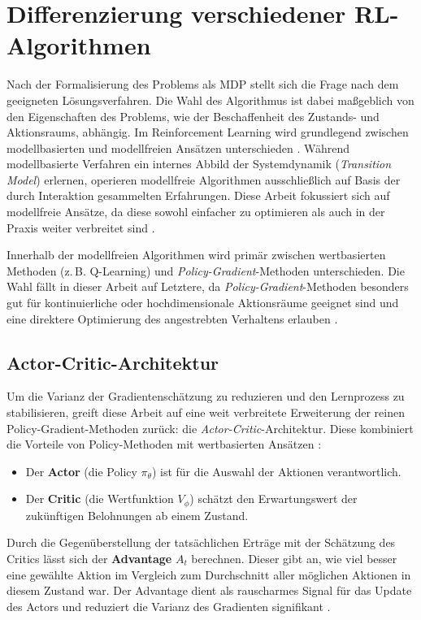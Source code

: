 \section{Differenzierung verschiedener RL\hyp{}Algorithmen}

Nach der Formalisierung des Problems als \ac{MDP} stellt sich die Frage nach dem geeigneten Lösungsverfahren. Die Wahl des Algorithmus ist dabei maßgeblich von den Eigenschaften des Problems, wie der Beschaffenheit des Zustands- und Aktionsraums, abhängig.
Im Reinforcement Learning wird grundlegend zwischen modellbasierten und modellfreien Ansätzen unterschieden \cite[Kap. 8]{sutton2018rl}. 
Während modellbasierte Verfahren ein internes Abbild der Systemdynamik (\textit{Transition Model}) erlernen, 
operieren modellfreie Algorithmen ausschließlich auf Basis der durch Interaktion gesammelten Erfahrungen. Diese Arbeit fokussiert sich auf modellfreie Ansätze, da diese sowohl einfacher zu optimieren als auch in der Praxis weiter verbreitet sind \cite{SpinningUp2018}.
\medskip

Innerhalb der modellfreien Algorithmen wird primär zwischen wertbasierten Methoden (z.\,B. Q\hyp{}Learning) und \textit{Policy\hyp{}Gradient}\hyp{}Methoden unterschieden. 
Die Wahl fällt in dieser Arbeit auf Letztere, da \textit{Policy\hyp{}Gradient}\hyp{}Methoden besonders gut für kontinuierliche oder hochdimensionale Aktionsräume 
geeignet sind und eine direktere Optimierung des angestrebten Verhaltens erlauben \cite[Kap. 13.2]{sutton2018rl}.

\subsection{Actor\hyp{}Critic\hyp{}Architektur}
Um die Varianz der Gradientenschätzung zu reduzieren und den Lernprozess zu stabilisieren, greift diese Arbeit auf eine weit verbreitete Erweiterung der reinen Policy\hyp{}Gradient\hyp{}Methoden zurück: die \textit{Actor\hyp{}Critic}\hyp{}Architektur.
Diese kombiniert die Vorteile von Policy\hyp{}Methoden mit wertbasierten Ansätzen \cite[Kap. 13.5]{sutton2018rl}:
\begin{itemize}
    \item Der \textbf{Actor} (die Policy $\pi_\theta$) ist für die Auswahl der Aktionen verantwortlich.
    \item Der \textbf{Critic} (die Wertfunktion $V_\phi$) schätzt den Erwartungswert der zukünftigen Belohnungen ab einem Zustand.
\end{itemize}
Durch die Gegenüberstellung der tatsächlichen Erträge mit der Schätzung des Critics lässt sich der \textbf{Advantage} $A_t$ berechnen.
Dieser gibt an, wie viel besser eine gewählte Aktion im Vergleich zum Durchschnitt aller möglichen Aktionen in diesem Zustand war. Der Advantage
dient als rauscharmes Signal für das Update des Actors und reduziert die Varianz des Gradienten signifikant \cite[Kap. 13.5]{sutton2018rl}.

